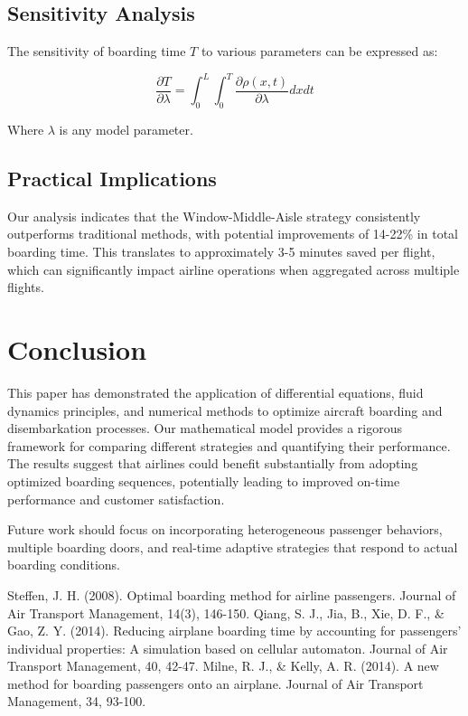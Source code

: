 \documentclass[a4paper,12pt]{article}
\begin{document}
\subsection{Sensitivity Analysis}

The sensitivity of boarding time $T$ to various parameters can be expressed as:

\begin{equation}
\frac{\partial T}{\partial \lambda} = \int_0^L \int_0^T \frac{\partial \rho(x,t)}{\partial \lambda} dx dt
\end{equation}

Where $\lambda$ is any model parameter.

\subsection{Practical Implications}

Our analysis indicates that the Window-Middle-Aisle strategy consistently outperforms traditional methods, with potential improvements of 14-22\% in total boarding time. This translates to approximately 3-5 minutes saved per flight, which can significantly impact airline operations when aggregated across multiple flights.

\section{Conclusion}

This paper has demonstrated the application of differential equations, fluid dynamics principles, and numerical methods to optimize aircraft boarding and disembarkation processes. Our mathematical model provides a rigorous framework for comparing different strategies and quantifying their performance. The results suggest that airlines could benefit substantially from adopting optimized boarding sequences, potentially leading to improved on-time performance and customer satisfaction.

Future work should focus on incorporating heterogeneous passenger behaviors, multiple boarding doors, and real-time adaptive strategies that respond to actual boarding conditions.

\begin{thebibliography}{99}
 Steffen, J. H. (2008). Optimal boarding method for airline passengers. Journal of Air Transport Management, 14(3), 146-150.
 Qiang, S. J., Jia, B., Xie, D. F., & Gao, Z. Y. (2014). Reducing airplane boarding time by accounting for passengers' individual properties: A simulation based on cellular automaton. Journal of Air Transport Management, 40, 42-47.
 Milne, R. J., & Kelly, A. R. (2014). A new method for boarding passengers onto an airplane. Journal of Air Transport Management, 34, 93-100.
\end{thebibliography}
\end{document}

